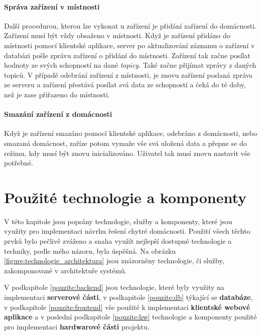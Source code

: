 \newpage
\subsubsection*{Správa zařízení v místnosti}
Další procedurou, kterou lze vykonat u zařízení je přidání zařízení do domácnosti. Zařízení musí být vždy obsaženo v místnosti.
Když je zařízení přidáno do místnosti pomocí klientské aplikace, server po aktualizování záznamu o zařízení v databázi pošle zprávu zařízení o přidání do místnosti.
Zařízení tak začne posílat hodnoty ze svých schopností na dané \emph{topicy}. Také začne přijímat zprávy z daných topiců.
V případě odebrání zařízení z místnosti, je znovu zařízení poslaná zpráva ze serveru a zařízení přestává posílat svá data ze schopností a čeká do té doby, než je zase přiřazeno do místnosti.
\newline

\subsubsection*{Smazání zařízení z domácnosti}
Když je zařízení smazáno pomocí klientské aplikace, odebráno z domácnosti, nebo smazaná domácnost, zaříze potom vymaže vše svá uložená data a přepne se do režimu, kdy musí být znovu inicializováno.
Uživatel tak musí znovu nastavit vše potřebné.

\newpage
\chapter{Použité technologie a komponenty}
\label{pouzite}

V této kapitole jsou popsány technologie, služby a komponenty, které jsou využity pro implementaci návrhu řešení chytré domácnosti.
Použití všech těchto prvků bylo pečlivě zváženo a snaha využít nejlepší dostupné technologie a techniky, podle mého názoru, byla úspěšná.
Na obrázku \ref{figure:technologie_architektura} jsou znázorněny technologie, či služby, zakomponované v architektuře systémů.

V podkapitole \ref{pouzite:backend} jsou technologie, které byly využity na implementaci \textbf{serverové části}, v podkapitole \ref{pouzite:db} týkající se \textbf{databáze},
v podkapitole \ref{pouzite:frontend} vše použité k implementaci \textbf{klientské webové aplikace} a v poslední podkapitole \ref{pouzite:hw} technologie a komponenty použité pro implementaci \textbf{hardwarové části} projektu.

